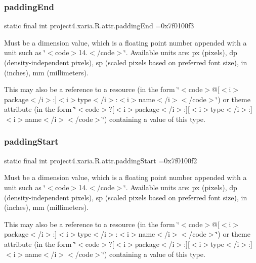 \subsubsection{\texorpdfstring{padding\+End}{paddingEnd}}
{\footnotesize\ttfamily static final int project4.\+xaria.\+R.\+attr.\+padding\+End =0x7f0100f3\hspace{0.3cm}{\ttfamily [static]}}

Must be a dimension value, which is a floating point number appended with a unit such as \char`\"{}$<$code$>$14.\+5sp$<$/code$>$\char`\"{}. Available units are\+: px (pixels), dp (density-\/independent pixels), sp (scaled pixels based on preferred font size), in (inches), mm (millimeters). 

This may also be a reference to a resource (in the form \char`\"{}$<$code$>$@\mbox{[}$<$i$>$package$<$/i$>$\+:\mbox{]}$<$i$>$type$<$/i$>$\+:$<$i$>$name$<$/i$>$$<$/code$>$\char`\"{}) or theme attribute (in the form \char`\"{}$<$code$>$?\mbox{[}$<$i$>$package$<$/i$>$\+:\mbox{]}\mbox{[}$<$i$>$type$<$/i$>$\+:\mbox{]}$<$i$>$name$<$/i$>$$<$/code$>$\char`\"{}) containing a value of this type. \mbox{\label{classproject4_1_1xaria_1_1R_1_1attr_a3042d6341eb03ef2f6eb5468b9ebf914}} 
\subsubsection{\texorpdfstring{padding\+Start}{paddingStart}}
{\footnotesize\ttfamily static final int project4.\+xaria.\+R.\+attr.\+padding\+Start =0x7f0100f2\hspace{0.3cm}{\ttfamily [static]}}

Must be a dimension value, which is a floating point number appended with a unit such as \char`\"{}$<$code$>$14.\+5sp$<$/code$>$\char`\"{}. Available units are\+: px (pixels), dp (density-\/independent pixels), sp (scaled pixels based on preferred font size), in (inches), mm (millimeters). 

This may also be a reference to a resource (in the form \char`\"{}$<$code$>$@\mbox{[}$<$i$>$package$<$/i$>$\+:\mbox{]}$<$i$>$type$<$/i$>$\+:$<$i$>$name$<$/i$>$$<$/code$>$\char`\"{}) or theme attribute (in the form \char`\"{}$<$code$>$?\mbox{[}$<$i$>$package$<$/i$>$\+:\mbox{]}\mbox{[}$<$i$>$type$<$/i$>$\+:\mbox{]}$<$i$>$name$<$/i$>$$<$/code$>$\char`\"{}) containing a value of this type. \mbox{\label{classproject4_1_1xaria_1_1R_1_1attr_a49879ea588b3ac92fd5d8cbaed579fb3}} 
